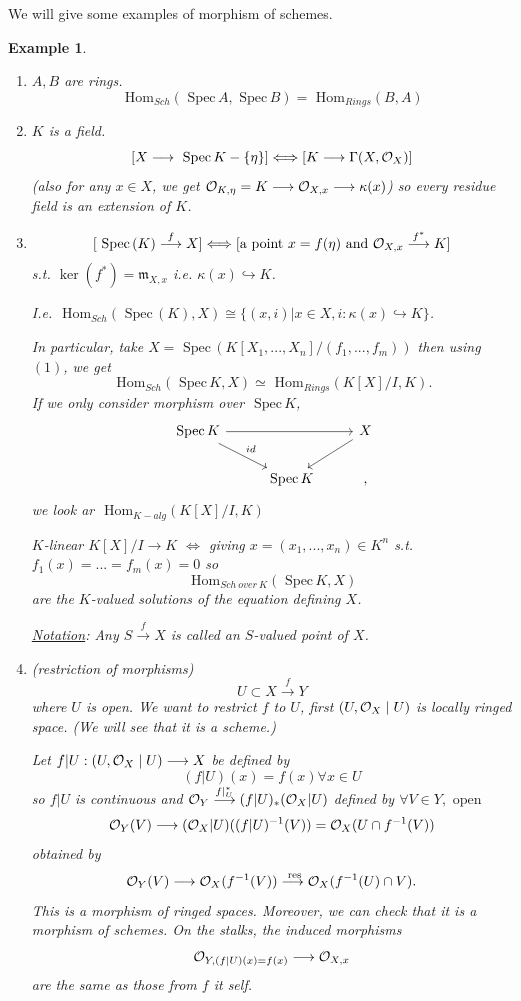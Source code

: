 \documentclass[11pt]{article}
\newtheorem{ex}[thm]{Example}
\renewcommand{\hom}{\text{ Hom}}
\newcommand{\spec}{\text{ Spec}\,}
\newcommand{\res}{\text{ res}}
\newcommand{\scm}{{\mathfrak m}}
\newcommand{\calo}{{\cal O}}
\newcommand{\lrta}{\longrightarrow}
\newcommand{\Llrta}{\Longleftrightarrow}
\newcommand{\inj}{\hookrightarrow}
\begin{document}
We will give some examples of morphism of schemes.
\begin{ex}
\begin{enumerate}[label=(\arabic*)]
\item $A, B$ are rings. 
$$
\hom_{Sch}(\spec A,\spec B)=\hom_{Rings}(B,A)
$$
\item $K$ is a field.
$$
[X\lrta \spec K-\{\eta\}]\Llrta [K\lrta \Gamma(X,\calo_X)]
$$
(also for any $x\in X$, we get $\calo_{K,\eta}=K\lrta \calo_{X,x}\lrta \kappa(x)$) so every residue field is an extension of $K$.
\item $$
[\spec(K)\overset{f}{\lrta } X]\Llrta [\text{a point $x=f(\eta)$ and } \calo_{X,x}\overset{f^*}{\lrta } K]
$$
s.t. $\ker(f^*)=\scm_{X,x}$ i.e. $\kappa(x)\inj K$.

I.e. $\hom_{Sch}(\spec(K), X)\cong\{(x,i)|x\in X, i:\kappa(x)\inj K\}$. 

In particular, take $X=\spec(K[X_1,...,X_n]/(f_1,...,f_m))$ then using $(1)$, we get 
$$
\hom_{Sch}(\spec K, X)\simeq \hom_{Rings}(K[X]/I, K).
$$
If we only consider morphism over $\spec K$,
$$
\begin{tikzcd}
\spec K \arrow[rd, "id"] \arrow[rr] &  &X \arrow[ld] \\
 & \spec K & ,
\end{tikzcd}
$$
we look ar $\hom_{K-alg}(K[X]/I ,K)$

$K$-linear $K[X]/I\lrta K$ $\Llrta $ giving $x=(x_1,...,x_n)\in K^n$ s.t. $f_1(x)=...=f_m(x)=0$ so
$$
\hom_{Sch\ over\ K}(\spec K, X)
$$
are the $K$-valued solutions of the equation defining $X$.

\underline{Notation}: Any $S\overset{f}{\lrta }X$ is called an $S$-valued point of $X$.
\item  (restriction of morphisms)
$$
U\subset X\overset{f}{\lrta} Y
$$
where $U$ is open. We want to restrict $f$ to $U$, first $(U,\calo_X\mid U)$ is locally ringed space. (We will see that it is a scheme.)

Let $f|U:(U,\calo_X\mid U)\lrta X$ be defined by 
$$
(f|U)(x)=f(x)\forall x\in U
$$
so $f| U$ is continuous and 
$\calo_Y\overset{f|_U^*}{\lrta }(f|U)_*(\calo_X|U)$ defined by 
$
\forall V\in Y,\text{ open }
$
$$
\calo_Y(V)\lrta (\calo_X|U)((f|U)^{-1} (V))=\calo_X(U\cap f^{-1}(V))
$$
obtained by 
$$
\calo_Y(V)\lrta \calo_X(f^{-1}(V))\overset{\res}{\lrta}\calo_{X}(f^{-1}(U)\cap V).
$$
This is a morphism of ringed spaces. Moreover, we can check that it is a morphism of schemes. On the stalks, the induced morphisms 
$$
\calo_{Y,(f|U)(x)=f(x)}\lrta \calo_{X,x}
$$
are the same as those from $f$ it self. 


\end{enumerate}
\end{ex}
\end{document}
